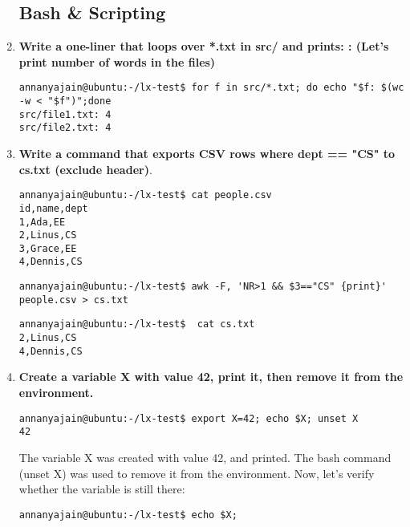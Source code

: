 \begin{enumerate}[leftmargin=2em]
\begin{Verbatim}[formatcom=\color{blue}]
\end{Verbatim}


\subsection{Bash \& Scripting}

\item \textbf{Write a one-liner that loops over *.txt in src/ and prints: : (Let's print number of words in the files)}
\begin{Verbatim}[formatcom=\color{blue}]
annanyajain@ubuntu:-/lx-test$ for f in src/*.txt; do echo "$f: $(wc -w < "$f")";done
src/file1.txt: 4
src/file2.txt: 4

\end{Verbatim}


\item \textbf{Write a command that exports CSV rows where dept == "CS" to cs.txt (exclude header)}.


\begin{Verbatim}[formatcom=\color{blue}]
annanyajain@ubuntu:-/lx-test$ cat people.csv
id,name,dept
1,Ada,EE
2,Linus,CS
3,Grace,EE
4,Dennis,CS

\end{Verbatim}


\begin{Verbatim}[formatcom=\color{blue}]
annanyajain@ubuntu:-/lx-test$ awk -F, 'NR>1 && $3=="CS" {print}' people.csv > cs.txt
\end{Verbatim}


\begin{Verbatim}[formatcom=\color{blue}]
annanyajain@ubuntu:-/lx-test$  cat cs.txt
2,Linus,CS
4,Dennis,CS
\end{Verbatim}


\item \textbf{Create a variable X with value 42, print it, then remove it from the environment.
}
\begin{Verbatim}[formatcom=\color{blue}]
annanyajain@ubuntu:-/lx-test$ export X=42; echo $X; unset X
42

\end{Verbatim}
The variable X was created with value 42, and printed. The bash command (unset X) was used to remove it from the environment. Now, let's verify whether the variable is still there:

\begin{Verbatim}[formatcom=\color{blue}]
annanyajain@ubuntu:-/lx-test$ echo $X;

\end{Verbatim}

\end{enumerate}